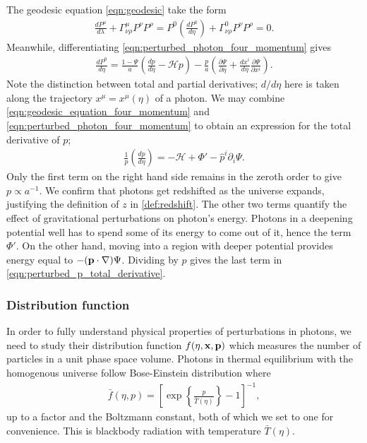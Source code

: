 The geodesic equation \eqref{eqn:geodesic} take the form
\begin{align}
	\frac{dP^\mu}{d\lambda} + \Gamma^\mu_{\nu\rho} P^\nu P^\rho = P^0 \left( \frac{dP^0}{d\eta} \right) + \Gamma^0_{\nu\rho} P^\nu P^\rho = 0.  \label{eqn:geodesic_equation_four_momentum}
\end{align}
Meanwhile, differentiating \eqref{eqn:perturbed_photon_four_momentum} gives
\begin{align}
	\frac{dP^0}{d\eta} = \frac{1-\Psi}{a} \left( \frac{dp}{d\eta} - \mathcal{H}p \right) - \frac{p}{a} \left( \frac{\partial\Psi}{\partial\eta} + \frac{dx^i}{d\eta} \frac{\partial\Psi}{\partial x^i}  \right). \label{eqn:perturbed_energy_total_derivative}
\end{align}
Note the distinction between total and partial derivatives; $d/d\eta$ here is taken along the trajectory $x^\mu = x^\mu(\eta)$ of a photon. We may combine \eqref{eqn:geodesic_equation_four_momentum} and \eqref{eqn:perturbed_photon_four_momentum} to obtain an expression for the total derivative of $p$;
\begin{align}
	\frac{1}{p} \left( \frac{dp}{d\eta} \right) = - \mathcal{H} + \Phi' - \hat{p}^i \partial_i \Psi. \label{eqn:perturbed_p_total_derivative}
\end{align}
Only the first term on the right hand side remains in the zeroth order to give $p\propto a^{-1}$. We confirm that photons get redshifted as the universe expands, justifying the definition of $z$ in \eqref{def:redshift}. The other two terms quantify the effect of gravitational perturbations on photon's energy. Photons in a deepening potential well has to spend some of its energy to come out of it, hence the term $\Phi'$. On the other hand, moving into a region with deeper potential provides energy equal to $-({\mathbf{p}}\cdot\nabla)\Psi$. Dividing by $p$ gives the last term in \eqref{eqn:perturbed_p_total_derivative}.


\subsubsection*{Distribution function} \label{section:distribution_function}
In order to fully understand physical properties of perturbations in photons, we need to study their distribution function $f(\eta,\mathbf{x},\mathbf{p})$ which measures the number of particles in a unit phase space volume. Photons in thermal equilibrium with the homogenous universe follow Bose-Einstein distribution where   
\begin{align}
	\bar{f}(\eta, p) = \left[ \exp \left\{ \frac{p}{\bar{T}(\eta)} \right\} - 1 \right]^{-1}, \label{eqn:photon_distribution_function}
\end{align}
up to a factor and the Boltzmann constant, both of which we set to one for convenience. This is blackbody radiation with temperature $\bar{T}(\eta)$.

